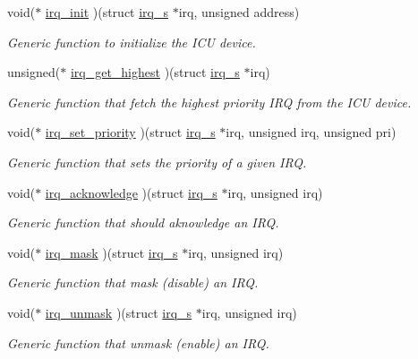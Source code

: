 \begin{DoxyCompactItemize}
\item 
void($\ast$ \hyperlink{structirq__ops__s_af7516d83c7d067bc9c7e3c410faab92b}{irq\-\_\-init} )(struct \hyperlink{structirq__s}{irq\-\_\-s} $\ast$irq, unsigned address)
\begin{DoxyCompactList}\small\item\em Generic function to initialize the I\-C\-U device. \end{DoxyCompactList}\item 
unsigned($\ast$ \hyperlink{structirq__ops__s_a1ef2b203959777a212125e1ea0d4d79c}{irq\-\_\-get\-\_\-highest} )(struct \hyperlink{structirq__s}{irq\-\_\-s} $\ast$irq)
\begin{DoxyCompactList}\small\item\em Generic function that fetch the highest priority I\-R\-Q from the I\-C\-U device. \end{DoxyCompactList}\item 
void($\ast$ \hyperlink{structirq__ops__s_a006ff212c6c42156888344a2c69216c5}{irq\-\_\-set\-\_\-priority} )(struct \hyperlink{structirq__s}{irq\-\_\-s} $\ast$irq, unsigned irq, unsigned pri)
\begin{DoxyCompactList}\small\item\em Generic function that sets the priority of a given I\-R\-Q. \end{DoxyCompactList}\item 
void($\ast$ \hyperlink{structirq__ops__s_a2dffdb09714e3498b8962381d71718c5}{irq\-\_\-acknowledge} )(struct \hyperlink{structirq__s}{irq\-\_\-s} $\ast$irq, unsigned irq)
\begin{DoxyCompactList}\small\item\em Generic function that should aknowledge an I\-R\-Q. \end{DoxyCompactList}\item 
void($\ast$ \hyperlink{structirq__ops__s_a4c58f73360cca86bafa18725c9c7d88d}{irq\-\_\-mask} )(struct \hyperlink{structirq__s}{irq\-\_\-s} $\ast$irq, unsigned irq)
\begin{DoxyCompactList}\small\item\em Generic function that mask (disable) an I\-R\-Q. \end{DoxyCompactList}\item 
void($\ast$ \hyperlink{structirq__ops__s_ab4aee47b81dc80dcbf2b52c0a3ea0365}{irq\-\_\-unmask} )(struct \hyperlink{structirq__s}{irq\-\_\-s} $\ast$irq, unsigned irq)
\begin{DoxyCompactList}\small\item\em Generic function that unmask (enable) an I\-R\-Q. \end{DoxyCompactList}\end{DoxyCompactItemize}


